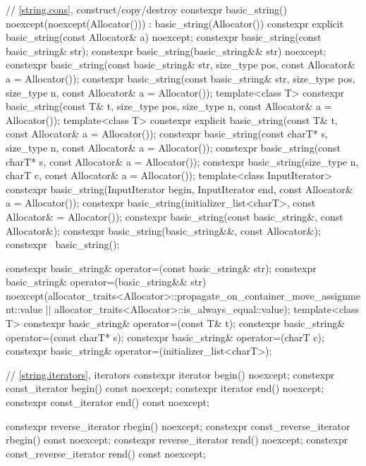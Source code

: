 \begin{codeblock}
{{    // \ref{string.cons}, construct/copy/destroy
    constexpr basic_string() noexcept(noexcept(Allocator())) : basic_string(Allocator()) { }
    constexpr explicit basic_string(const Allocator& a) noexcept;
    constexpr basic_string(const basic_string& str);
    constexpr basic_string(basic_string&& str) noexcept;
    constexpr basic_string(const basic_string& str, size_type pos,
                           const Allocator& a = Allocator());
    constexpr basic_string(const basic_string& str, size_type pos, size_type n,
                           const Allocator& a = Allocator());
    template<class T>
      constexpr basic_string(const T& t, size_type pos, size_type n,
                             const Allocator& a = Allocator());
    template<class T>
      constexpr explicit basic_string(const T& t, const Allocator& a = Allocator());
    constexpr basic_string(const charT* s, size_type n, const Allocator& a = Allocator());
    constexpr basic_string(const charT* s, const Allocator& a = Allocator());
    constexpr basic_string(size_type n, charT c, const Allocator& a = Allocator());
    template<class InputIterator>
      constexpr basic_string(InputIterator begin, InputIterator end,
                             const Allocator& a = Allocator());
    constexpr basic_string(initializer_list<charT>, const Allocator& = Allocator());
    constexpr basic_string(const basic_string&, const Allocator&);
    constexpr basic_string(basic_string&&, const Allocator&);
    constexpr ~basic_string();

    constexpr basic_string& operator=(const basic_string& str);
    constexpr basic_string& operator=(basic_string&& str)
      noexcept(allocator_traits<Allocator>::propagate_on_container_move_assignment::value ||
               allocator_traits<Allocator>::is_always_equal::value);
    template<class T>
      constexpr basic_string& operator=(const T& t);
    constexpr basic_string& operator=(const charT* s);
    constexpr basic_string& operator=(charT c);
    constexpr basic_string& operator=(initializer_list<charT>);

    // \ref{string.iterators}, iterators
    constexpr iterator       begin() noexcept;
    constexpr const_iterator begin() const noexcept;
    constexpr iterator       end() noexcept;
    constexpr const_iterator end() const noexcept;

    constexpr reverse_iterator       rbegin() noexcept;
    constexpr const_reverse_iterator rbegin() const noexcept;
    constexpr reverse_iterator       rend() noexcept;
    constexpr const_reverse_iterator rend() const noexcept;

}}
\end{codeblock}
